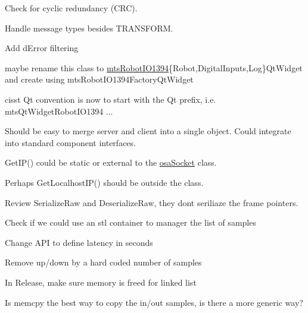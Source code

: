 \begin{DoxyRefList}
Check for cyclic redundancy (C\+R\+C). 

Handle message types besides T\+R\+A\+N\+S\+F\+O\+R\+M.  
\item[\label{todo__todo000015}%
\hypertarget{todo__todo000015}{}%
File \hyperlink{mts_p_i_d_8h}{mts\+P\+I\+D.h} ]Add d\+Error filtering  
\item[\label{todo__todo000020}%
\hypertarget{todo__todo000020}{}%
Class \hyperlink{classmts_robot_i_o1394_qt_widget}{mts\+Robot\+I\+O1394\+Qt\+Widget} ]maybe rename this class to \hyperlink{classmts_robot_i_o1394}{mts\+Robot\+I\+O1394}\{Robot,Digital\+Inputs,Log\}Qt\+Widget and create using mts\+Robot\+I\+O1394\+Factory\+Qt\+Widget 

cisst Qt convention is now to start with the Qt prefix, i.\+e. mts\+Qt\+Widget\+Robot\+I\+O1394 ...  
\item[\label{todo__todo000016}%
\hypertarget{todo__todo000016}{}%
Class \hyperlink{classmts_tele_operation}{mts\+Tele\+Operation} ]
\item[\label{todo__todo000009}%
\hypertarget{todo__todo000009}{}%
Class \hyperlink{classmts_watchdog_server}{mts\+Watchdog\+Server} ]Should be easy to merge server and client into a single object. Could integrate into standard component interfaces.  
\item[\label{todo__todo000006}%
\hypertarget{todo__todo000006}{}%
File \hyperlink{osa_socket_8h}{osa\+Socket.h} ]Get\+I\+P() could be static or external to the \hyperlink{classosa_socket}{osa\+Socket} class. 

Perhaps Get\+Localhost\+I\+P() should be outside the class.  
\item[\label{todo__todo000010}%
\hypertarget{todo__todo000010}{}%
Class \hyperlink{classprm_velocity_cartesian_set}{prm\+Velocity\+Cartesian\+Set} ]Review Serialize\+Raw and Deserialize\+Raw, they don\textquotesingle{}t seriliaze the frame pointers.  
\item[\label{todo__todo000011}%
\hypertarget{todo__todo000011}{}%
Class \hyperlink{classsvl_filter_add_latency}{svl\+Filter\+Add\+Latency} ]Check if we could use an stl container to manager the list of samples 

Change A\+P\+I to define latency in seconds 

Remove up/down by a hard coded number of samples 

In Release, make sure memory is freed for linked list 

Is memcpy the best way to copy the in/out samples, is there a more generic way? 


\end{DoxyRefList}
